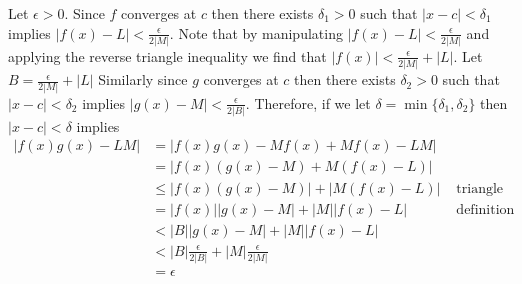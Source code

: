 \documentclass[12pt, letterpaper]{article}
\begin{document}
\begin{enumerate}
\begin{enumerate}
		Let $\epsilon > 0$.  Since $f$ converges at $c$ then there exists $\delta_1 > 0$ such that $|x-c| < \delta_1$ implies $|f(x) - L| < \frac{\epsilon}{2|M|}$.  Note that by manipulating $|f(x) - L| < \frac{\epsilon}{2|M|}$ and applying the reverse triangle inequality we find that $|f(x)| < \frac{\epsilon}{2|M|} + |L|$.  Let $B = \frac{\epsilon}{2|M|} + |L|$   Similarly since $g$ converges at $c$ then there exists $\delta_2 > 0$ such that 
		$|x-c| < \delta_2$ implies $|g(x) - M| < \frac{\epsilon}{2|B|}$.
		Therefore, 
		if we let $\delta = \min \{\delta_1, \delta_2\}$ then $|x - c| < \delta$ implies\\
		\begin{align*}
			|f(x)g(x) - LM|&= |f(x)g(x) -Mf(x) + Mf(x) - LM|\\
			&= |f(x)(g(x) - M) + M(f(x) - L)|\\
			&\leq |f(x)(g(x) - M)| + |M(f(x) - L)| & \text{ triangle inequality}\\
			&= |f(x)||g(x) - M| + |M||f(x) - L| & \text{ definition of absolute value}\\
			&< |B||g(x) - M| + |M||f(x) - L|\\
			&< |B| \frac{\epsilon}{2|B|} + |M| \frac{\epsilon}{2|M|}\\
			&= \epsilon
		\end{align*}
	\end{enumerate}
	\end{enumerate}
\end{document}
